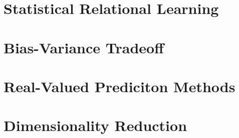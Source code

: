 \documentclass{article}
\begin{document}
	\section{Statistical Relational Learning}
		\clearpage

	\section{Bias-Variance Tradeoff}
		\clearpage

	\section{Real-Valued Prediciton Methods}
		\clearpage

	\section{Dimensionality Reduction}
		\clearpage

	\appendix


	
\end{document}
